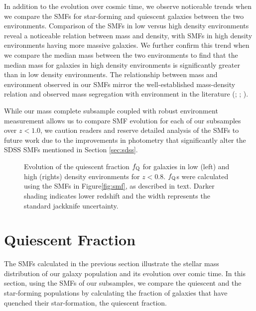 \documentclass{emulateapj}
\begin{document}
In addition to the evolution over cosmic time, we observe noticeable trends when we compare the SMFs for star-forming and quiescent galaxies between the two environments. Comparison of the SMFs in low versus high density environments reveal a noticeable relation between mass and density, with SMFs in high density environments having more massive galaxies. We further confirm this trend when we compare the median mass between the two environments to find that the median mass for galaxies in high density environments is significantly greater than in low density environments. The relationship between mass and environment observed in our SMFs mirror the well-established mass-density relation and observed mass segregation with environment in the literature (\cite{bundy06a}; \cite{Scodeggio:2009aa}; \cite{Bolzonella:2010aa}).

While our mass complete subsample coupled with robust environment measurement allows us to compare SMF evolution for each of our subsamples over $z < 1.0$, we caution readers and reserve detailed analysis of the SMFs to future work due to the improvements in photometry that significantly alter the SDSS SMFs mentioned in Section \ref{sec:sdss}. 

\begin{figure*}
    \begin{center}
        \leavevmode
        \caption{Evolution of the quiescent fraction $f_{\rm{Q}}$ for galaxies in low (left) and high (rights) density environments for $z < 0.8$. $f_{\rm{Q}}$s were calculated using the SMFs in Figure\ref{fig:smf}, as described in text. Darker shading indicates lower redshift and the width represents the standard jackknife uncertainty.}         \label{fig:qf}
    \end{center}
\end{figure*}
\section{Quiescent Fraction} \label{sec:qf_const}
The SMFs calculated in the previous section illustrate the stellar mass distribution of our galaxy population and its evolution over comic time. In this section, using the SMFs of our subsamples, we compare the quiescent and the star-forming populations by calculating the fraction of galaxies that have quenched their star-formation, the quiescent fraction. 
\end{document}
